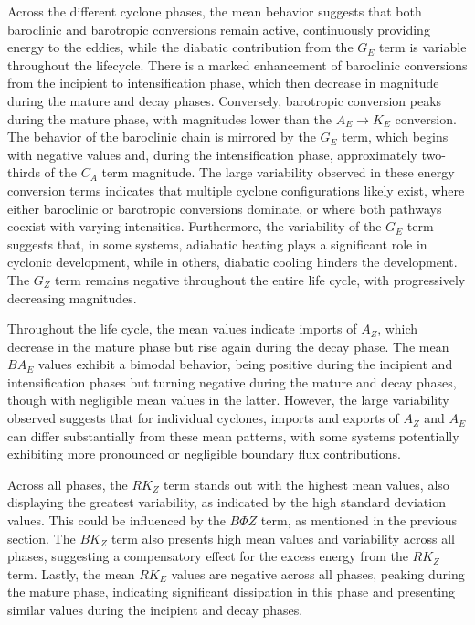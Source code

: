 \documentclass[pdflatex,sn-chicago]{sn-jnl}%
\theoremstyle{plain}
\theoremstyle{definition}
\theoremstyle{remark}
\theoremstyle{definition}
\begin{document}
Across the different cyclone phases, the mean behavior suggests that both baroclinic and barotropic conversions remain active, continuously providing energy to the eddies, while the diabatic contribution from the $G_E$ term is variable throughout the lifecycle. There is a marked enhancement of baroclinic conversions from the incipient to intensification phase, which then decrease in magnitude during the mature and decay phases. Conversely, barotropic conversion peaks during the mature phase, with magnitudes lower than the $A_E \rightarrow K_E$ conversion. The behavior of the baroclinic chain is mirrored by the $G_E$ term, which begins with negative values and, during the intensification phase, approximately two-thirds of the $C_A$ term magnitude. The large variability observed in these energy conversion terms indicates that multiple cyclone configurations likely exist, where either baroclinic or barotropic conversions dominate, or where both pathways coexist with varying intensities. Furthermore, the variability of the $G_E$ term suggests that, in some systems, adiabatic heating plays a significant role in cyclonic development, while in others, diabatic cooling hinders the development. The $G_Z$ term remains negative throughout the entire life cycle, with progressively decreasing magnitudes.

Throughout the life cycle, the mean values indicate imports of $A_Z$, which decrease in the mature phase but rise again during the decay phase. The mean $BA_E$ values exhibit a bimodal behavior, being positive during the incipient and intensification phases but turning negative during the mature and decay phases, though with negligible mean values in the latter. However, the large variability observed suggests that for individual cyclones, imports and exports of $A_Z$ and $A_E$ can differ substantially from these mean patterns, with some systems potentially exhibiting more pronounced or negligible boundary flux contributions.

Across all phases, the $RK_Z$ term stands out with the highest mean values, also displaying the greatest variability, as indicated by the high standard deviation values. This could be influenced by the $B\Phi Z$ term, as mentioned in the previous section. The $BK_Z$ term also presents high mean values and variability across all phases, suggesting a compensatory effect for the excess energy from the $RK_Z$ term. Lastly, the mean $RK_E$ values are negative across all phases, peaking during the mature phase, indicating significant dissipation in this phase and presenting similar values during the incipient and decay phases.
\end{document}
